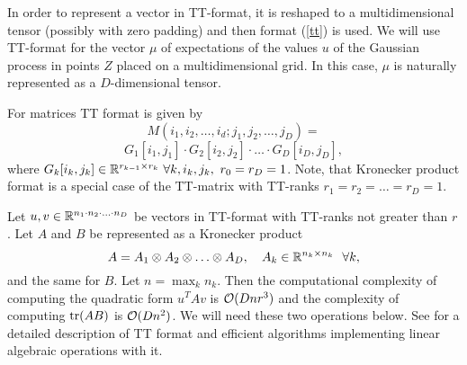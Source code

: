   In order to represent a vector in TT-format, it is reshaped to a multidimensional
  tensor (possibly with zero padding) and then format (\ref{tt}) is used. We will
  use TT-format for the vector $\mu$ of expectations of the values $u$ of the
  Gaussian process in points $Z$ placed on a multidimensional grid. In this case,
  $\mu$ is naturally represented as a $D$-dimensional tensor.

  For matrices TT format is given by
  \[
    M(i_1, i_2, \ldots, i_d; j_1, j_2, \ldots, j_D) = 
  \]
  \[
    G_1 [i_1, j_1] \cdot
    G_2[i_2, j_2] \cdot \ldots \cdot G_D[i_D, j_D],
  \]
  where $G_k[i_k, j_k] \in \mathbb{R}^{r_{k-1}\times r_{k}}\ \forall k, i_k, j_k,\ r_0 = r_{D} = 1$.
  Note, that Kronecker product format is a special case of the TT-matrix with TT-ranks
  $r_1 = r_2 = \ldots = r_{D} = 1$.

  Let $u, v \in \mathbb{R}^{n_1 \cdot n_2 \cdot \ldots \cdot n_D}$ be vectors
  in TT-format with TT-ranks not greater than $r$. Let $A$ and $B$ be represented as a Kronecker product
  \[
    A = A_1 \otimes A_2 \otimes \ldots \otimes A_D,~~~A_k \in \mathbb{R}^{n_k \times n_k}~~\forall k,
  \]
  and the same for $B$. Let $n = \max_k n_k$. Then the computational complexity
  of computing the quadratic form $u^T A v$ is $\mathcal{O}(Dnr^3)$  and the 
  complexity of computing $\mbox{tr}(AB)$ is
  $\mathcal{O}(Dn^2)$. We will need these two
  operations below. See \citet{oseledets2011} for a detailed description of
  TT format and efficient algorithms implementing linear algebraic operations
  with it.
